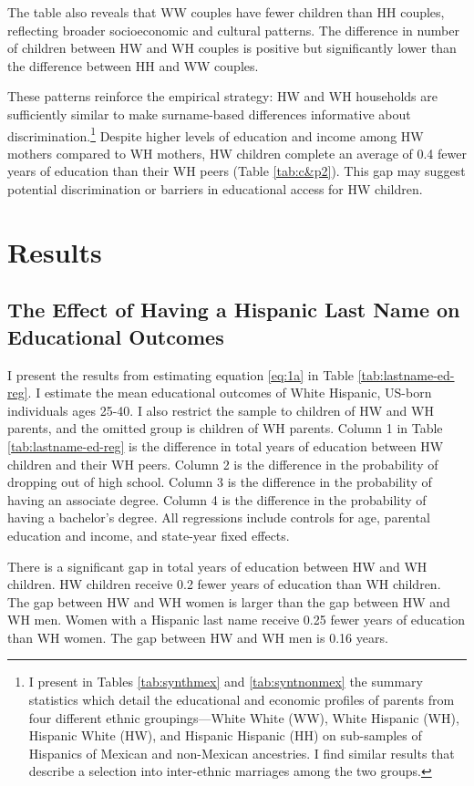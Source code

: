 The table also reveals that WW couples have fewer children than HH couples, reflecting broader socioeconomic and cultural patterns. The difference in number of children between HW and WH couples is positive but significantly lower than the difference between HH and WW couples.

These patterns reinforce the empirical strategy: HW and WH households are sufficiently similar to make surname-based differences informative about discrimination.\footnote{I present in Tables \ref{tab:synthmex} and \ref{tab:syntnonmex} the summary statistics which detail the educational and economic profiles of parents from four different ethnic groupings—White White (WW), White Hispanic (WH), Hispanic White (HW), and Hispanic Hispanic (HH) on sub-samples of Hispanics of Mexican and non-Mexican ancestries. I find similar results that describe a selection into inter-ethnic marriages among the two groups.} Despite higher levels of education and income among HW mothers compared to WH mothers, HW children complete an average of 0.4 fewer years of education than their WH peers (Table \ref{tab:c&p2}). This gap may suggest potential discrimination or barriers in educational access for HW children.

\section{Results}\label{sec:results}

\subsection{The Effect of Having a Hispanic Last Name on Educational Outcomes}

I present the results from estimating equation \ref{eq:1a} in Table \ref{tab:lastname-ed-reg}. I estimate the mean educational outcomes of White Hispanic, US-born individuals ages 25-40. I also restrict the sample to children of HW and WH parents, and the omitted group is children of WH parents. Column 1 in Table \ref{tab:lastname-ed-reg} is the difference in total years of education between HW children and their WH peers. Column 2 is the difference in the probability of dropping out of high school. Column 3 is the difference in the probability of having an associate degree. Column 4 is the difference in the probability of having a bachelor’s degree. All regressions include controls for age, parental education and income, and state-year fixed effects.

There is a significant gap in total years of education between HW and WH children. HW children receive 0.2 fewer years of education than WH children. The gap between HW and WH women is larger than the gap between HW and WH men. Women with a Hispanic last name receive 0.25 fewer years of education than WH women. The gap between HW and WH men is 0.16 years.

